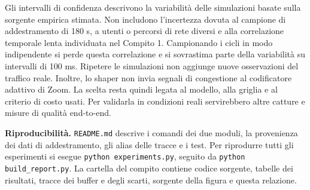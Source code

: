 \documentclass[10pt,a4paper]{article}
\begin{document}
Gli intervalli di confidenza descrivono la variabilità delle simulazioni basate
sulla sorgente empirica stimata. Non includono l'incertezza dovuta al campione di
addestramento di 180 s, a utenti o percorsi di rete diversi e alla correlazione
temporale lenta individuata nel Compito 1. Campionando i cicli in modo indipendente
si perde questa correlazione e si sovrastima parte della variabilità su intervalli
di 100 ms. Ripetere le simulazioni non aggiunge nuove osservazioni del traffico reale.
Inoltre, lo shaper non invia segnali di congestione al codificatore adattivo di Zoom.
La scelta resta quindi legata al modello, alla griglia e al criterio di costo usati.
Per validarla in condizioni reali servirebbero altre catture e misure di qualità
end-to-end.

\textbf{Riproducibilità.} \texttt{README.md} descrive i comandi dei due moduli,
la provenienza dei dati di addestramento, gli alias delle tracce e i test.
Per riprodurre tutti gli esperimenti si esegue \texttt{python experiments.py},
seguito da \texttt{python build\_report.py}. La cartella del compito contiene
codice sorgente, tabelle dei risultati, tracce dei buffer e degli scarti,
sorgente della figura e questa relazione.
\end{document}
